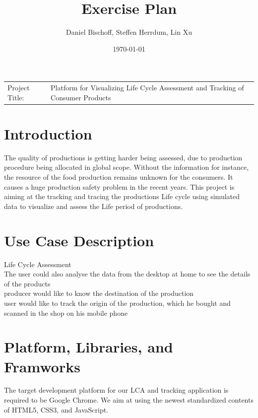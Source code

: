 \documentclass[a4page]{article}
\author{Daniel Bischoff, Steffen Herrdum, Lin Xu}
\title{Exercise Plan}
\date{\today}
\begin{document}
\maketitle

\begin{table}[!th]
\begin{tabular}{l p{}}

Project Title: & Platform for Visualizing Life Cycle Assessment and Tracking of Consumer Products \\

\end{tabular}
\end{table}

\section{Introduction}
The quality of productions is getting harder being assessed, due to production procedure being allocated in global scope.
Without the information for instance, the resource of the food production remains unknown for the consumers.
It causes a huge production safety problem in the recent years.
This project is aiming at the tracking and tracing the productions Life cycle using simulated data to visualize and assess the Life period of productions. 

\section{Use Case Description}

Life Cycle Assessment\\
The user could also analyse the data from the desktop at home to see the details of the products\\
producer would like to know the destination of the production\\
user would like to track the origin of the production, which he bought and scanned in the shop on his mobile phone\\

\section{Platform, Libraries, and Framworks}
The target development platform for our \ac{LCA} and tracking application is required to be Google Chrome. 
We aim at using the newest standardized contents of HTML5, CSS3, and JavaScript.
\end{document}
